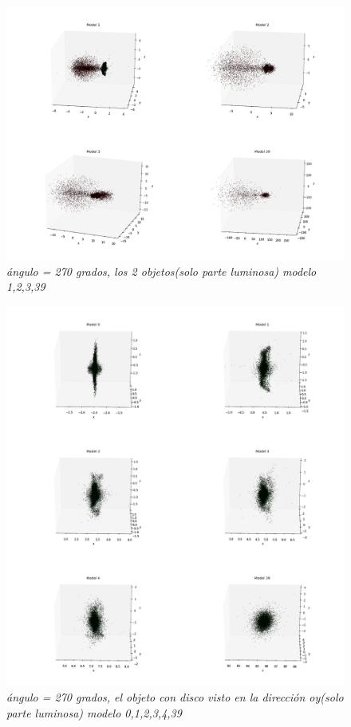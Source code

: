 \documentclass[12pt]{article} %
\renewcommand{\=}[1]{\stackrel{#1}{=}} %
\theoremstyle{definition}
\theoremstyle{remark}
\begin{document}
\begin{figure}[!ht]
 \centering
 \includegraphics[scale=0.2]{270deg_m_sep5.png}
 \caption{\emph{ ángulo = 270 grados, los 2 objetos(solo parte luminosa) modelo 1,2,3,39 }}
\end{figure}

\begin{figure}[!ht]
 \centering
 \includegraphics[scale=0.2]{270deg-m-c2y.png}
 \caption{\emph{ ángulo = 270 grados, el objeto con disco visto en la dirección oy(solo parte luminosa) modelo 0,1,2,3,4,39 }}
\end{figure}
\end{document}
